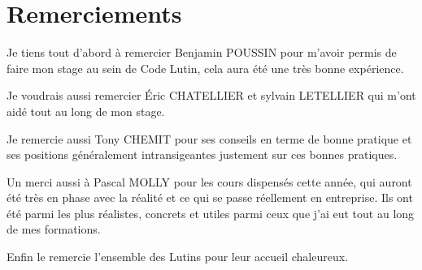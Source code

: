 \section*{Remerciements}

Je tiens tout d'abord à remercier Benjamin POUSSIN pour m'avoir permis de faire 
mon stage au sein de Code Lutin, cela aura été une très bonne expérience.

Je voudrais aussi remercier Éric CHATELLIER et sylvain LETELLIER qui m'ont 
aidé tout au long de mon stage.

Je remercie aussi Tony CHEMIT pour ses conseils en terme de bonne pratique et ses
positions généralement intransigeantes justement sur ces bonnes pratiques.

Un merci aussi à Pascal MOLLY pour les cours dispensés cette année,
qui auront été très en phase avec la réalité et ce qui se passe réellement en 
entreprise. Ils ont été parmi les plus réalistes, concrets et utiles parmi ceux
que j'ai eut tout au long de mes formations.

Enfin le remercie l'ensemble des Lutins pour leur accueil chaleureux.
